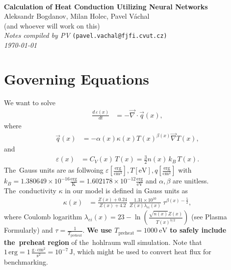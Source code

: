 \documentclass[12pt]{article}
\def\cond{\kappa}
\def\clog{\lambda_{ei}}
\begin{document}

\begin{center}
\hrulefill\\[4mm]
{\Large\bf Calculation of Heat Conduction Utilizing Neural Networks}\\[4mm]
{\large Aleksandr Bogdanov,\quad
        Milan Holec,\quad
        Pavel V\'{a}chal}\\[3mm]
{\normalsize (and whoever will work on this)}\\[8mm]
{\it Notes compiled by PV} {\tt(pavel.vachal@fjfi.cvut.cz)}\\[3mm]
{\it \today}\\[2mm]
\hrulefill
\end{center}
\tableofcontents

\hrulefill
\section{Governing Equations}

We want to solve
\begin{align}\label{pde}
  \frac{d\,\varepsilon(x)}{dt} &= -\vec{\nabla} \cdot \vec{q}(x), 
\end{align}
where
\begin{align}\label{q_TbNT}
    \vec{q}(x)&= - \alpha(x) \cond(x) T(x)^{\beta(x)} \vec{\nabla} T(x),  
\end{align}
and
\begin{align}\label{e_kB}
  \varepsilon(x)
  &= C_V(x)\,T(x) = \frac{3}{2}n(x)\,k_B\,T(x) .
\end{align}
The~Gauss units are as follwoing 
$\varepsilon\left[\frac{\mathrm{erg}}{\mathrm{cm}^3}\right], T [\mathrm{eV}], q [\frac{\mathrm{erg}}{\mathrm{cm}^2}]$
with $k_B= 1.380649\times 10^{-16} \frac{\mathrm{erg}}{\mathrm{K}}
      = 1.602178\times 10^{-12} \frac{\mathrm{erg}}{\mathrm{eV}}$ and $\alpha, \beta$ are unitless.
The~conductivity $\cond$ in our model is defined in Gauss units as
\begin{align}
  \cond(x)&= \frac{Z(x) + 0.24}{Z(x) + 4.2}~ 
    \frac{1.31 \times 10^{10}}{Z(x) \clog(x)}~
    \tau^{\beta(x)-\frac{5}{2}} , 
\end{align}
where Coulomb logarithm 
$\clog(x) = 23 - \ln\left(\frac{\sqrt{n(x)} Z(x)}{T(x)^{3/2}}\right)$ 
(see Plasma Formularly) and $\tau = \frac{1}{T_\mathrm{preheat}}$. 
{\bf We use $T_\mathrm{preheat} = 1000~\mathrm{eV}$ to safely include 
the~preheat region} of the~hohlraum wall simulation. Note that 
$1\,\mathrm{erg}= 1\,\frac{\mathrm{g}\cdot\mathrm{cm}^2}{\mathrm{s}^2}
= 10^{-7}\,\mathrm{J}$, which might be used to convert heat flux for 
benchmarking.
\end{document}
